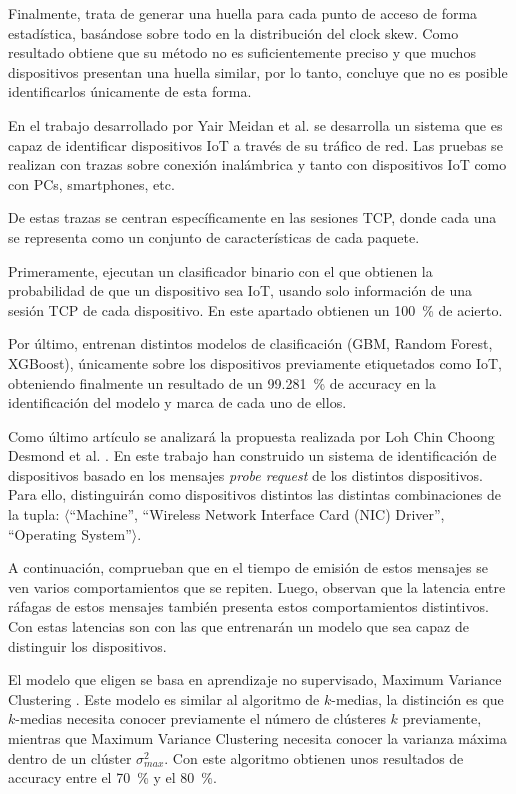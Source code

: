 Finalmente, trata de generar una huella para cada punto de acceso de forma estadística, basándose sobre todo en la distribución del clock skew. Como resultado obtiene que su método no es suficientemente preciso y que muchos dispositivos presentan una huella similar, por lo tanto, concluye que no es posible identificarlos únicamente de esta forma.

En el trabajo desarrollado por Yair Meidan et al. \cite{meidan2017profiliot} se desarrolla un sistema que es capaz de identificar dispositivos IoT a través de su tráfico de red. Las pruebas se realizan con trazas sobre conexión inalámbrica y tanto con dispositivos IoT como con PCs, smartphones, etc. 

De estas trazas se centran específicamente en las sesiones TCP, donde cada una se representa como un conjunto de características de cada paquete.

Primeramente, ejecutan un clasificador binario con el que obtienen la probabilidad de que un dispositivo sea IoT, usando solo información de una sesión TCP de cada dispositivo. En este apartado obtienen un \SI{100}{\percent} de acierto.

Por último, entrenan distintos modelos de clasificación (GBM, Random Forest, XGBoost), únicamente sobre los dispositivos previamente etiquetados como IoT, obteniendo finalmente un resultado de un \SI{99.281}{\percent} de accuracy en la identificación del modelo y marca de cada uno de ellos.

Como último artículo se analizará la propuesta realizada por Loh Chin Choong Desmond et al. \cite{desmond2008identifying}. En este trabajo han construido un sistema de identificación de dispositivos basado en los mensajes \textit{probe request} de los distintos dispositivos. Para ello, distinguirán como dispositivos distintos las distintas combinaciones de la tupla: $\langle$``Machine'', ``Wireless Network Interface Card (NIC) Driver'', ``Operating System''$\rangle$.

A continuación, comprueban que en el tiempo de emisión de estos mensajes se ven varios comportamientos que se repiten. Luego, observan que la latencia entre ráfagas de estos mensajes también presenta estos comportamientos distintivos. Con estas latencias son con las que entrenarán un modelo que sea capaz de distinguir los dispositivos.

El modelo que eligen se basa en aprendizaje no supervisado, Maximum Variance Clustering \cite{veenman2002maximum}. Este modelo es similar al algoritmo de $k$-medias, la distinción es que $k$-medias necesita conocer previamente el número de clústeres $k$ previamente, mientras que Maximum Variance Clustering necesita conocer la varianza máxima dentro de un clúster $\sigma^2_{max}$. Con este algoritmo obtienen unos resultados de accuracy entre el \SI{70}{\percent} y el \SI{80}{\percent}.


